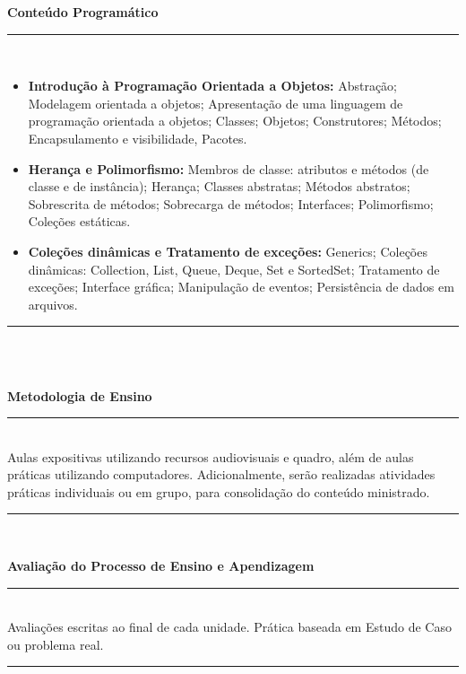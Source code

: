 \begin{center}\textbf{Conteúdo Programático}\end{center}
\noindent\rule{16.2cm}{0.4pt}
\\
\begin{itemize}
 \item \textbf{Introdução à Programação Orientada a Objetos:} Abstração; Modelagem orientada a objetos; Apresentação de uma linguagem de programação orientada a objetos;	Classes; Objetos; Construtores; Métodos; Encapsulamento e visibilidade, Pacotes.


 \item \textbf{Herança e Polimorfismo:} Membros de classe: atributos e métodos (de classe e de instância); Herança;	Classes abstratas; Métodos abstratos; Sobrescrita de métodos; Sobrecarga de métodos; Interfaces;	Polimorfismo; Coleções estáticas.

 \item \textbf{Coleções dinâmicas e Tratamento de exceções:} Generics; Coleções dinâmicas: Collection, List, Queue, Deque, Set e SortedSet; Tratamento de exceções; Interface gráfica; Manipulação de eventos; Persistência de dados em arquivos.
\end{itemize}
\noindent\rule{16.2cm}{0.4pt}\\
\\

\begin{center}\textbf{Metodologia de Ensino}\end{center} 
\noindent\rule{16.2cm}{0.4pt}
\\
   Aulas expositivas utilizando recursos audiovisuais e quadro, além de aulas práticas utilizando computadores. Adicionalmente, serão realizadas atividades práticas individuais ou em grupo, para consolidação do conteúdo ministrado.\\
\noindent\rule{16.2cm}{0.4pt}\\


\begin{center}\textbf{Avaliação do Processo de Ensino e Apendizagem}\end{center}
\noindent\rule{16.2cm}{0.4pt}
\\
   Avaliações escritas ao final de cada unidade. Prática baseada em Estudo de Caso ou problema real.\\
\noindent\rule{16.2cm}{0.4pt}\\
\\

